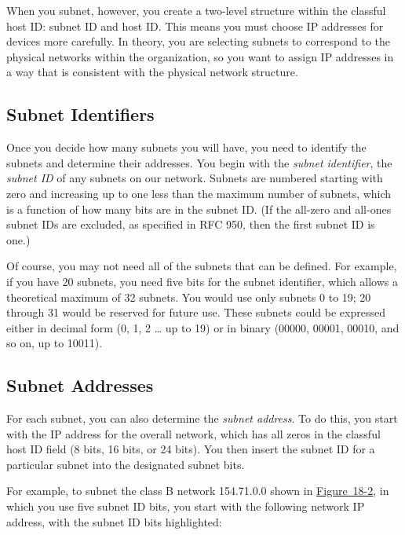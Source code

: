 When you subnet, however, you create a two-level structure within the
classful host ID: subnet ID and host ID. This means you must choose IP
addresses for devices more carefully. In theory, you are selecting
subnets to correspond to the physical networks within the organization,
so you want to assign IP addresses in a way that is consistent with the
physical network structure.

\subsection[Subnet
Identifiers]{\texorpdfstring{Subnet
Identifiers}{Subnet Identifiers}}

Once you decide how many subnets you will have, you need to identify the
subnets and determine their addresses. You begin with the {\emph{subnet
identifier}}, the {\emph{subnet ID}} of any subnets on our network.
Subnets are numbered starting with zero and increasing up to one less
than the maximum number of subnets, which is a function of how many bits
are in the subnet ID. (If the all-zero and all-ones subnet IDs are
excluded, as specified in RFC 950, then the first subnet ID is one.)

Of course, you may not need all of the subnets that can be defined. For
example, if you have 20 subnets, you need five bits for the subnet
identifier, which allows a theoretical maximum of 32 subnets. You would
use only subnets 0 to 19; 20 through 31 would be reserved for future
use. These subnets could be expressed either in decimal form (0, 1, 2
\ldots{} up to 19) or in binary (00000, 00001, 00010, and so on, up to
10011).

\subsection[Subnet
Addresses]{\texorpdfstring{Subnet
Addresses}{Subnet Addresses}}

For each subnet, you can also determine the {\emph{subnet address}}. To
do this, you start with the IP address for the overall network, which
has all zeros in the classful host ID field (8 bits, 16 bits, or 24
bits). You then insert the subnet ID for a particular subnet into the
designated subnet bits.

For example, to subnet the class B network 154.71.0.0 shown in
\protect\hyperlink{ch18s03.htmlux5cux23determining_the_subnet_mask_of_a_subnett}{Figure~18-2},
in which you use five subnet ID bits, you start with the following
network IP address, with the subnet ID bits highlighted:

